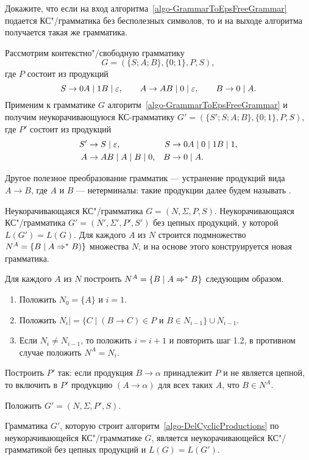 \begin{myproblem}
\label{problem-GrammarToEpsFreeGrammarWOUselessSymbols}
Докажите, что если на вход алгоритма~\ref{algo-GrammarToEpsFreeGrammar} подается КС"/грамматика без бесполезных символов, то и на выходе алгоритма получается такая же грамматика.
\end{myproblem}

\begin{myexample}
Рассмотрим контекстно"/свободную грамматику
\[
    G=(\{S;A;B\},\{0;1\},P,S),
\]
где $P$ состоит из продукций
\[
	S \to 0A \mid 1B \mid \varepsilon, \qquad
    A \to AB \mid 0 \mid \varepsilon, \qquad
    B \to 0 \mid A.
\]
Применим к грамматике $G$ алгоритм~\ref{algo-GrammarToEpsFreeGrammar} и получим неукорачивающуюся КС-грамматику $G'=(\{S';S;A;B\},\{0;1\},P,S)$, где $P'$ состоит из продукций
\begin{align*}
    S' &\to S \mid \varepsilon, &
    S  &\to 0A \mid 0 \mid 1B \mid 1, \\
    A  &\to AB \mid A \mid B \mid 0, &
    B  &\to 0 \mid A.
\end{align*}
\end{myexample}

Другое полезное преобразование грамматик --- устранение продукций вида $A\to B$, где $A$ и $B$ --- нетерминалы: такие продукции далее будем называть .

{\label{algo-DelCyclicProductions}Неукорачивающаяся КС"/грамматика $G=(N,\Sigma,P,S)$.}
{Неукорачивающаяся КС"/грамматика $G'=(N',\Sigma',P',S')$ без цепных продукций, у которой $L(G')=L(G)$.}
{Для каждого $A$ из $N$ строится подмножество $N^A=\{B\mid A\Rightarrow^*B)\}$ множества $N$, и на основе этого конструируется новая грамматика.}
{
\item
Для каждого $A$ из $N$ построить $N^A=\{B\mid A\Rightarrow^*B\}$ следующим образом.
\begin{enumerate}[leftmargin=1cm]
\item Положить $N_0=\{A\}$ и $i=1$.

\item Положить $N_i|=\{C\mid (B\to C)\in P$ и $B\in N_{i-1}\}\cup N_{i-1}$.

\item Если $N_i\neq N_{i-1}$, то положить $i=i+1$ и повторить шаг 1.2, в противном случае положить $N^A=N_i$.
\end{enumerate}

\item
Построить $P'$ так: если продукция $B\to\alpha$ принадлежит $P$ и не является цепной, то включить в $P'$ продукцию $(A\to\alpha)$ для всех таких $A$, что $B\in N^A$.

\item
Положить $G'=(N,\Sigma,P',S)$.
}
\begin{mytheorem}
\label{theorem-AlgoDelEpsProductionsCorrectnessWOEpsProducts}
Грамматика $G'$, которую строит алгоритм~\ref{algo-DelCyclicProductions} по неукорачивающейся КС"/грамматике $G$, является неукорачивающейся КС"/грамматикой без цепных продукций и $L(G)=L(G')$.
\end{mytheorem}


